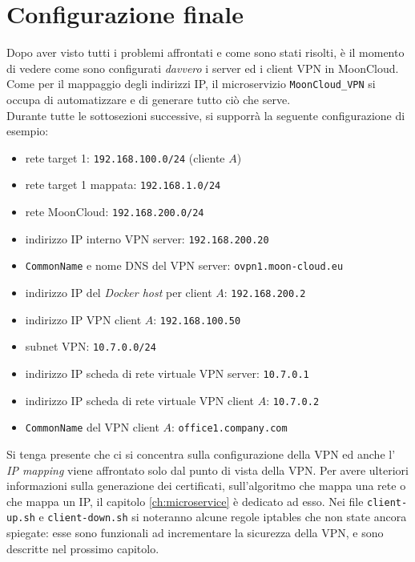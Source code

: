 \section{Configurazione finale}\label{sec:ending}
Dopo aver visto tutti i problemi affrontati e come sono stati risolti, è il
momento di vedere come sono configurati \textit{davvero} i server ed i client
VPN in MoonCloud. Come per il mappaggio degli indirizzi IP, il microservizio
\texttt{MoonCloud\_VPN}
si occupa di automatizzare e di generare tutto ciò che
serve.\\
Durante tutte le sottosezioni successive, si supporrà la seguente configurazione
di esempio:
\begin{itemize}
  \item rete target 1: \texttt{192.168.100.0/24} (cliente $A$)
  \item rete target 1 mappata: \texttt{192.168.1.0/24}
  \item rete MoonCloud: \texttt{192.168.200.0/24}
  \item indirizzo IP interno VPN server: \texttt{192.168.200.20}
  \item \texttt{CommonName} e nome DNS del VPN server: \texttt{ovpn1.moon-cloud.eu}
  \item indirizzo IP del \textit{Docker host} per client $A$: \texttt{192.168.200.2}
  \item indirizzo IP VPN client $A$: \texttt{192.168.100.50}
  \item subnet VPN: \texttt{10.7.0.0/24}
  \item indirizzo IP scheda di rete virtuale VPN server: \texttt{10.7.0.1}
  \item indirizzo IP scheda di rete virtuale VPN client $A$: \texttt{10.7.0.2}
  \item \texttt{CommonName} del VPN client $A$: \texttt{office1.company.com}
\end{itemize}
Si tenga presente che ci si concentra sulla configurazione della VPN ed anche l'
\textit{IP mapping} viene affrontato solo dal punto di vista della VPN. Per avere ulteriori
informazioni sulla generazione dei certificati, sull'algoritmo che mappa una rete o che
mappa un IP, il capitolo \ref{ch:microservice} è dedicato ad esso.
Nei file \texttt{client-up.sh} e \texttt{client-down.sh} si noteranno alcune regole iptables
che non state ancora spiegate: esse sono funzionali ad incrementare la sicurezza della VPN,
e sono descritte nel prossimo capitolo.

